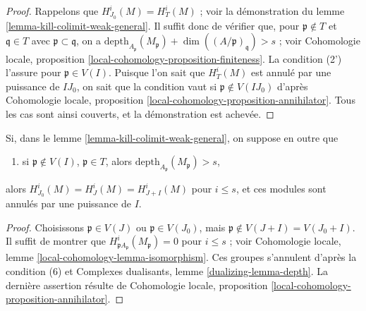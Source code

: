 \begin{proof}
Rappelons que $H^i_{J_0}(M) = H^i_T(M)$ ; voir la démonstration du
lemme \ref{lemma-kill-colimit-weak-general}. Il suffit donc de
vérifier que, pour $\mathfrak p \not \in T$ et $\mathfrak q \in T$
avec $\mathfrak p \subset \mathfrak q$, on a
$\text{depth}_{A_\mathfrak p}(M_\mathfrak p) +
\dim((A/\mathfrak p)_\mathfrak q) > s$ ; voir Cohomologie locale,
proposition \ref{local-cohomology-proposition-finiteness}.
La condition (2') l'assure pour $\mathfrak p \in V(I)$.
Puisque l'on sait que $H^i_T(M)$ est annulé par une puissance de $IJ_0$,
on sait que la condition vaut si $\mathfrak p \not \in V(IJ_0)$
d'après Cohomologie locale, proposition \ref{local-cohomology-proposition-annihilator}.
Tous les cas sont ainsi couverts, et la démonstration est achevée.
\end{proof}

\begin{lemma}
\label{lemma-kill-colimit-support-general}
Si, dans le lemme \ref{lemma-kill-colimit-weak-general}, on suppose en outre que
\begin{enumerate}
\item[(6)] si $\mathfrak p \not \in V(I)$, $\mathfrak p \in T$, alors
$\text{depth}_{A_\mathfrak p}(M_\mathfrak p) > s$,
\end{enumerate}
alors $H^i_{J_0}(M) = H^i_J(M) = H^i_{J + I}(M)$ pour $i \leq s$, et ces
modules sont annulés par une puissance de $I$.
\end{lemma}

\begin{proof}
Choisissons $\mathfrak p \in V(J)$ ou $\mathfrak p \in V(J_0)$, mais
$\mathfrak p \not \in V(J + I) = V(J_0 + I)$.
Il suffit de montrer que $H^i_{\mathfrak pA_\mathfrak p}(M_\mathfrak p) = 0$
pour $i \leq s$ ; voir
Cohomologie locale, lemme \ref{local-cohomology-lemma-isomorphism}.
Ces groupes s'annulent d'après la condition (6) et
Complexes dualisants, lemme \ref{dualizing-lemma-depth}.
La dernière assertion résulte de
Cohomologie locale, proposition \ref{local-cohomology-proposition-annihilator}.
\end{proof}


